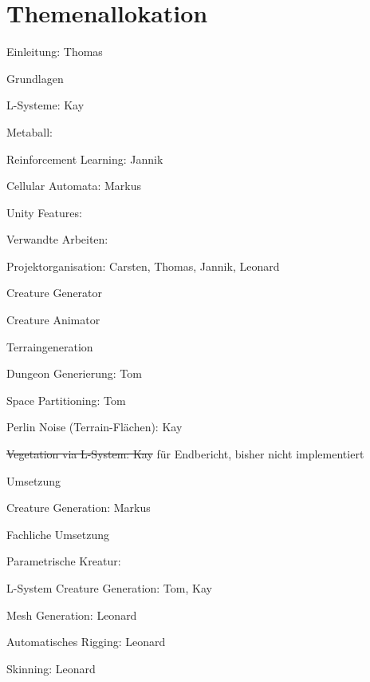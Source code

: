 \chapter*{Themenallokation} 

\begin{thallok}
	\item Einleitung: Thomas
	\item Grundlagen
	\begin{thallok}
		\item L-Systeme: Kay
		\item Metaball: 
		\item Reinforcement Learning: Jannik
		\item Cellular Automata: Markus
		\item Unity Features: 		
	\end{thallok}
	\item Verwandte Arbeiten: 
	\item Projektorganisation: Carsten, Thomas, Jannik, Leonard
	\begin{thallok}
		\item Creature Generator
		\item Creature Animator
		\item Terraingeneration
		\begin{thallok}
			\item Dungeon Generierung: Tom
			\item Space Partitioning: Tom
			\item Perlin Noise (Terrain-Flächen): Kay
			\item \sout{Vegetation via L-System: Kay} für Endbericht, bisher nicht implementiert
		\end{thallok}
	\end{thallok}
	\item Umsetzung
	\begin{thallok}
		\item Creature Generation: Markus
		\begin{thallok}
			\item Fachliche Umsetzung
				\begin{thallok}
					\item Parametrische Kreatur:
					\item L-System Creature Generation: Tom, Kay
					\item Mesh Generation: Leonard
					\item Automatisches Rigging: Leonard
					\item Skinning: Leonard

\end{thallok}
\end{thallok}
\end{thallok}
\end{thallok}
